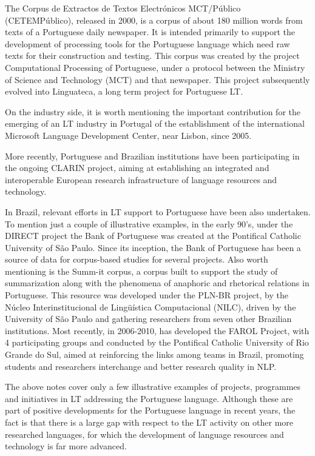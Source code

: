 \begin{multicols}{2}
The Corpus de Extractos de Textos Electrónicos MCT/Público (CETEMPúblico), released in 2000, is a corpus of about 180 million words from texts of a Portuguese daily newspaper. It is intended primarily to support the development of processing tools for the Portuguese language which need raw texts for their construction and testing. This corpus was created by the project Computational Processing of Portuguese, under a protocol between the Ministry of Science and Technology (MCT) and that newspaper. This project subsequently evolved into Linguateca, a long term project for Portuguese LT\cite{linguateca}.

On the industry side, it is worth mentioning the important contribution for the emerging of an LT industry in Portugal of the establishment of the international Microsoft Language Development Center, near Lisbon, since 2005.

More recently, Portuguese and Brazilian institutions have been participating in the ongoing CLARIN project, aiming at establishing an integrated and interoperable European research infrastructure of language resources and technology.

In Brazil, relevant efforts in LT support to Portuguese have been also undertaken. To mention just a couple of illustrative examples, in the early 90's, under the DIRECT project the Bank of Portuguese was created at the Pontifical Catholic University of São Paulo. Since its inception, the Bank of Portuguese has been a source of data for corpus-based studies for several projects. Also worth mentioning is the Summ-it corpus, a corpus built to support the study of summarization along with the phenomena of anaphoric and rhetorical relations in Portuguese. This resource was developed under the PLN-BR project, by the Núcleo Interinstitucional de Lingüística Computacional (NILC), driven by the University of São Paulo and gathering researchers from seven other Brazilian institutions. Most recently, in 2006-2010, has developed the FAROL Project, with 4 participating groups and conducted by the Pontifical Catholic University of Rio Grande do Sul, aimed at reinforcing the links among teams in Brazil, promoting students and researchers interchange and better research quality in NLP.

The above notes cover only a few illustrative examples of projects, programmes and initiatives in LT addressing the Portuguese language. Although these are part of positive developments for the Portuguese language in recent years, the fact is that there is a large gap with respect to the LT activity on other more researched languages, for which the development of language resources and technology is far more advanced. 


\end{multicols}
